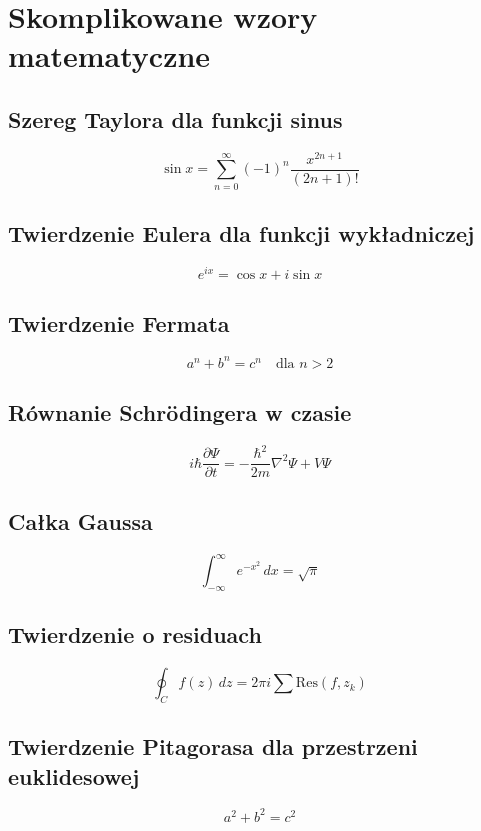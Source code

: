 \documentclass{article}
\begin{document}
\section*{Skomplikowane wzory matematyczne}

\subsection*{Szereg Taylora dla funkcji sinus}

\[
    \sin x = \sum_{n=0}^{\infty} (-1)^n \frac{x^{2n+1}}{(2n+1)!}
\]

\subsection*{Twierdzenie Eulera dla funkcji wykładniczej}

\[
    e^{ix} = \cos x + i \sin x
\]

\subsection*{Twierdzenie Fermata}

\[
    a^n + b^n = c^n \quad \text{dla } n > 2
\]

\subsection*{Równanie Schrödingera w czasie}

\[
    i\hbar\frac{\partial \Psi}{\partial t} = -\frac{\hbar^2}{2m}\nabla^2 \Psi + V \Psi
\]

\subsection*{Całka Gaussa}

\[
    \int_{-\infty}^{\infty} e^{-x^2} \,dx = \sqrt{\pi}
\]

\subsection*{Twierdzenie o residuach}

\[
    \oint_C f(z) \,dz = 2\pi i \sum \text{Res}(f, z_k)
\]

\subsection*{Twierdzenie Pitagorasa dla przestrzeni euklidesowej}

\[
    a^2 + b^2 = c^2
\]
\end{document}
